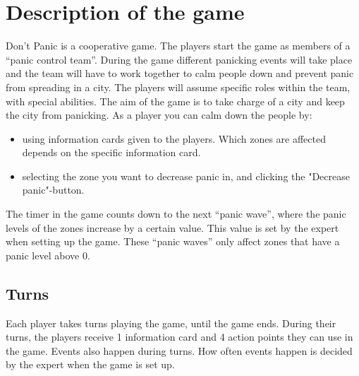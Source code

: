 \section*{Description of the game}
Don’t Panic is a cooperative game. The players start the game as members of a “panic control team”. During the game different panicking events will take place and the team will have to work together to calm people down and prevent panic from spreading in a city. The players will assume specific roles within the team, with special abilities. The aim of the game is to take charge of a city and keep the city from panicking. As a player you can calm down the people by:
\begin{itemize}
	\item using information cards given to the players. Which zones are affected depends on the specific information card.
	\item selecting the zone you want to decrease panic in, and clicking the "Decrease panic"-button.
\end{itemize}
The timer in the game counts down to the next “panic wave”, where the panic levels of the zones increase by a certain value. This value is set by the expert when setting up the game. These “panic waves” only affect zones that have a panic level above 0.\\
%
%
\subsection*{Turns}
Each player takes turns playing the game, until the game ends. During their turns, the players receive 1 information card and 4 action points they can use in the game. Events also happen during turns. How often events happen is decided by the expert when the game is set up.
%
%
